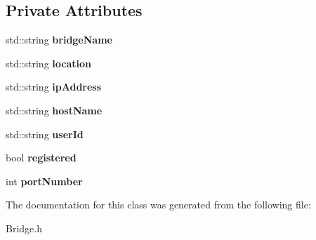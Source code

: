 \subsection*{Private Attributes}
\begin{DoxyCompactItemize}
\item 
std\+::string {\bfseries bridge\+Name}\hypertarget{classBridge_ac51c80c843b4df25faf5fa426e89811f}{}\label{classBridge_ac51c80c843b4df25faf5fa426e89811f}

\item 
std\+::string {\bfseries location}\hypertarget{classBridge_a04f9fec6433cadffde5fda71a004af96}{}\label{classBridge_a04f9fec6433cadffde5fda71a004af96}

\item 
std\+::string {\bfseries ip\+Address}\hypertarget{classBridge_a7e277fedd8e5d755f58c02a0f1c2bf80}{}\label{classBridge_a7e277fedd8e5d755f58c02a0f1c2bf80}

\item 
std\+::string {\bfseries host\+Name}\hypertarget{classBridge_a6a1ca8cc945fcd364e8147188930b304}{}\label{classBridge_a6a1ca8cc945fcd364e8147188930b304}

\item 
std\+::string {\bfseries user\+Id}\hypertarget{classBridge_a99b5742c2e826c016d6e1ed2fdb2f542}{}\label{classBridge_a99b5742c2e826c016d6e1ed2fdb2f542}

\item 
bool {\bfseries registered}\hypertarget{classBridge_aad587c8a2b91ebf99d45ad9960409041}{}\label{classBridge_aad587c8a2b91ebf99d45ad9960409041}

\item 
int {\bfseries port\+Number}\hypertarget{classBridge_af3ffbbc8063a22a9562600a098ac9109}{}\label{classBridge_af3ffbbc8063a22a9562600a098ac9109}

\end{DoxyCompactItemize}


The documentation for this class was generated from the following file\+:\begin{DoxyCompactItemize}
\item 
Bridge.\+h\end{DoxyCompactItemize}
